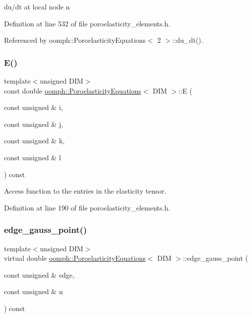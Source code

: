 du/dt at local node n 



Definition at line 532 of file poroelasticity\+\_\+elements.\+h.



Referenced by oomph\+::\+Poroelasticity\+Equations$<$ 2 $>$\+::du\+\_\+dt().

\mbox{\label{classoomph_1_1PoroelasticityEquations_ae40523d3812bc6c50ab5c23fd9359cad}} 
\subsubsection{\texorpdfstring{E()}{E()}}
{\footnotesize\ttfamily template$<$unsigned D\+IM$>$ \\
const double \hyperlink{classoomph_1_1PoroelasticityEquations}{oomph\+::\+Poroelasticity\+Equations}$<$ D\+IM $>$\+::E (\begin{DoxyParamCaption}\item[{const unsigned \&}]{i,  }\item[{const unsigned \&}]{j,  }\item[{const unsigned \&}]{k,  }\item[{const unsigned \&}]{l }\end{DoxyParamCaption}) const\hspace{0.3cm}{\ttfamily [inline]}}



Access function to the entries in the elasticity tensor. 



Definition at line 190 of file poroelasticity\+\_\+elements.\+h.

\mbox{\label{classoomph_1_1PoroelasticityEquations_af1e01a7f1546cc7e4c19bc3a6de145da}} 
\subsubsection{\texorpdfstring{edge\+\_\+gauss\+\_\+point()}{edge\_gauss\_point()}}
{\footnotesize\ttfamily template$<$unsigned D\+IM$>$ \\
virtual double \hyperlink{classoomph_1_1PoroelasticityEquations}{oomph\+::\+Poroelasticity\+Equations}$<$ D\+IM $>$\+::edge\+\_\+gauss\+\_\+point (\begin{DoxyParamCaption}\item[{const unsigned \&}]{edge,  }\item[{const unsigned \&}]{n }\end{DoxyParamCaption}) const\hspace{0.3cm}{\ttfamily [pure virtual]}}



